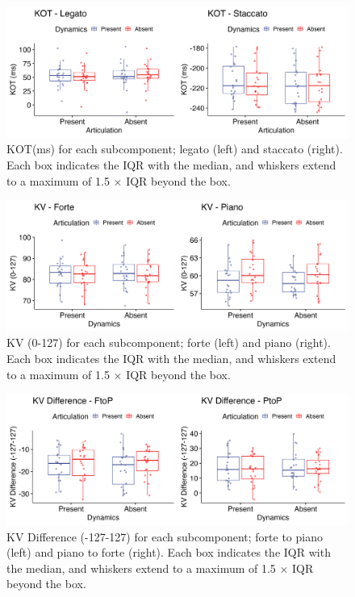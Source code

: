 \documentclass[
  man]{apa6}
\begin{document}
\begin{figure}
\includegraphics[width=1\linewidth]{manuscript_files/figure-latex/plot-kot-1-1} \caption{\label{fig:kot-1}KOT(ms) for each subcomponent; legato (left) and staccato (right). Each box indicates the IQR with the median, and whiskers extend to a maximum of 1.5 × IQR beyond the box.}\label{fig:plot-kot-1}
\end{figure}

\begin{figure}
\includegraphics[width=1\linewidth]{manuscript_files/figure-latex/plot-vel-1-1} \caption{\label{fig:vel-1}KV (0-127) for each subcomponent; forte (left) and piano (right). Each box indicates the IQR with the median, and whiskers extend to a maximum of 1.5 × IQR beyond the box.}\label{fig:plot-vel-1}
\end{figure}

\begin{figure}
\includegraphics[width=1\linewidth]{manuscript_files/figure-latex/plot-vel-diff-1-1} \caption{\label{fig:vel-diff-1}KV Difference (-127-127) for each subcomponent; forte to piano (left) and piano to forte (right). Each box indicates the IQR with the median, and whiskers extend to a maximum of 1.5 × IQR beyond the box.}\label{fig:plot-vel-diff-1}
\end{figure}
\end{document}
